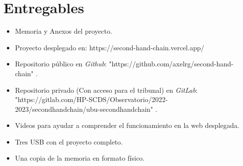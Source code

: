 \section{Entregables}
\begin{itemize}
    \item Memoria y Anexos del proyecto.
    \item Proyecto desplegado en: https://second-hand-chain.vercel.app/
    \item Repositorio público en \textit{Github}: "https://github.com/axelrg/second-hand-chain" .
    \item Repositorio privado (Con acceso para el tribunal) en \textit{GitLab}:
        "https://gitlab.com/HP-SCDS/Observatorio/2022-2023/secondhandchain/ubu-secondhandchain" .
    \item Videos para ayudar a comprender el funcionamiento en la web desplegada.
    \item Tres USB con el proyecto completo.
    \item Una copia de la memoria en formato físico.
\end{itemize}